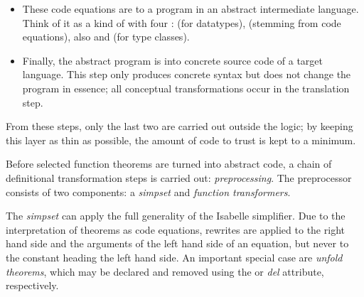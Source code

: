 \begin{isabellebody}
\begin{isamarkuptext}
\begin{itemize}
    \item These code equations are  to a program in an
      abstract intermediate language.  Think of it as a kind of
       with four :  (for
      datatypes),  (stemming from code equations), also
       and  (for type classes).

    \item Finally, the abstract program is  into
      concrete source code of a target language.  This step only
      produces concrete syntax but does not change the program in
      essence; all conceptual transformations occur in the translation
      step.

  \end{itemize}

  \noindent From these steps, only the last two are carried out
  outside the logic; by keeping this layer as thin as possible, the
  amount of code to trust is kept to a minimum.%
\end{isamarkuptext}%
\isamarkuptrue%
%
\isamarkuptrue%
%
\begin{isamarkuptext}%
Before selected function theorems are turned into abstract code, a
  chain of definitional transformation steps is carried out:
  \emph{preprocessing}.  The preprocessor consists of two
  components: a \emph{simpset} and \emph{function transformers}.

  The \emph{simpset} can apply the full generality of the Isabelle
  simplifier.  Due to the interpretation of theorems as code
  equations, rewrites are applied to the right hand side and the
  arguments of the left hand side of an equation, but never to the
  constant heading the left hand side.  An important special case are
  \emph{unfold theorems}, which may be declared and removed using the
  \hyperlink{attribute.code-unfold}{\mbox{}} or \emph{\hyperlink{attribute.code-unfold}{\mbox{}} del}
  attribute, respectively.


\end{isamarkuptext}
\end{isabellebody}
